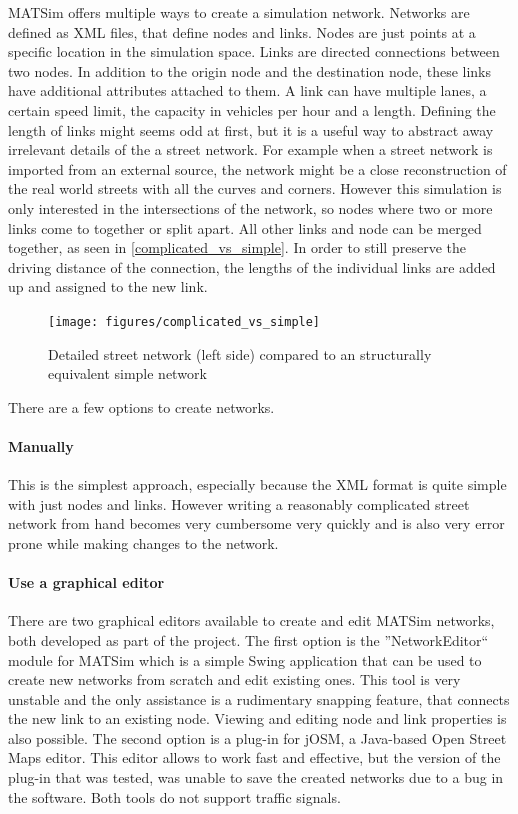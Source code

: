 MATSim offers multiple ways to create a simulation network. Networks are defined as XML files, that define nodes and links. Nodes are just points at a specific location in the simulation space. Links are directed connections between two nodes. In addition to the origin node and the destination node, these links have additional attributes attached to them. A link can have multiple lanes, a certain speed limit, the capacity in vehicles per hour and a length. Defining the length of links might seems odd at first, but it is a useful way to abstract away irrelevant details of the a street network. For example when a street network is imported from an external source, the network might be a close reconstruction of the real world streets with all the curves and corners. However this simulation is only interested in the intersections of the network, so nodes where two or more links come to together or split apart. All other links and node can be merged together, as seen in \autoref{complicated_vs_simple}. In order to still preserve the driving distance of the connection, the lengths of the individual links are added up and assigned to the new link.

\begin{figure}[ht!]
	\centering
	\texttt{[image: figures/complicated\_vs\_simple]}
	\caption{Detailed street network (left side) compared to an structurally equivalent simple network}
	\label{complicated_vs_simple}
\end{figure}

There are a few options to create networks.

\paragraph{Manually} This is the simplest approach, especially because the XML format is quite simple with just nodes and links. However writing a reasonably complicated street network from hand becomes very cumbersome very quickly and is also very error prone while making changes to the network.

\paragraph{Use a graphical editor} There are two graphical editors available to create and edit MATSim networks, both developed as part of the project. The first option is the ''NetworkEditor`` module for MATSim which is a simple Swing application that can be used to create new networks from scratch and edit existing ones. This tool is very unstable and the only assistance is a rudimentary snapping feature, that connects the new link to an existing node. Viewing and editing node and link properties is also possible. The second option is a plug-in for jOSM, a Java-based Open Street Maps editor. This editor allows to work fast and effective, but the version of the plug-in that was tested, was unable to save the created networks due to a bug in the software. Both tools do not support traffic signals.

